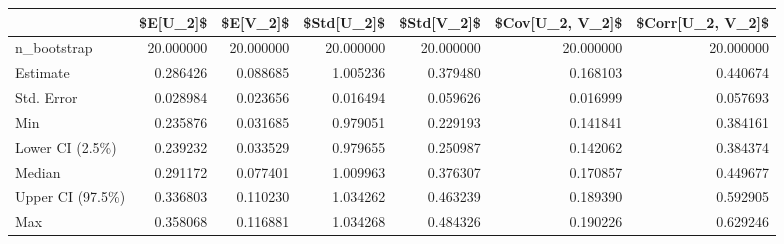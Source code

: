 \begin{tabular}{lrrrrrr}
\toprule
{} &   \$E[U\_2]\$ &   \$E[V\_2]\$ &  \$Std[U\_2]\$ &  \$Std[V\_2]\$ &  \$Cov[U\_2, V\_2]\$ &  \$Corr[U\_2, V\_2]\$ \\
\midrule
n\_bootstrap      &  20.000000 &  20.000000 &   20.000000 &   20.000000 &        20.000000 &         20.000000 \\
Estimate         &   0.286426 &   0.088685 &    1.005236 &    0.379480 &         0.168103 &          0.440674 \\
Std. Error       &   0.028984 &   0.023656 &    0.016494 &    0.059626 &         0.016999 &          0.057693 \\
Min              &   0.235876 &   0.031685 &    0.979051 &    0.229193 &         0.141841 &          0.384161 \\
Lower CI (2.5\%)  &   0.239232 &   0.033529 &    0.979655 &    0.250987 &         0.142062 &          0.384374 \\
Median           &   0.291172 &   0.077401 &    1.009963 &    0.376307 &         0.170857 &          0.449677 \\
Upper CI (97.5\%) &   0.336803 &   0.110230 &    1.034262 &    0.463239 &         0.189390 &          0.592905 \\
Max              &   0.358068 &   0.116881 &    1.034268 &    0.484326 &         0.190226 &          0.629246 \\
\bottomrule
\end{tabular}
